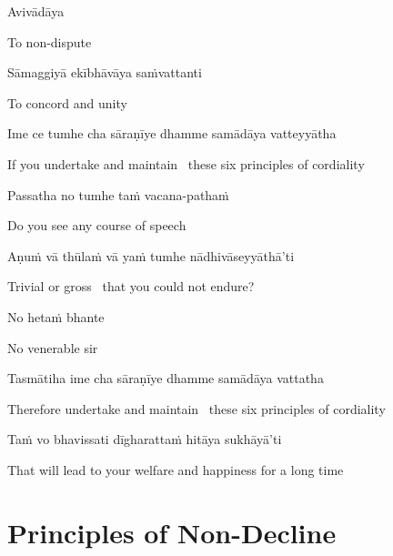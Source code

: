 Avivādāya

\begin{english}
  To non-dispute
\end{english}

Sāmaggiyā ekībhāvāya saṁvattanti

\begin{english}
  To concord and unity
\end{english}

\suttaRef{[MN 48]}

Ime ce tumhe cha sāraṇīye dhamme samādāya vatteyyātha

\begin{english}
  If you undertake and maintain \breathmark\ these six principles of cordiality
\end{english}

Passatha no tumhe taṁ vacana-pathaṁ

\begin{english}
  Do you see any course of speech
\end{english}

Aṇuṁ vā thūlaṁ vā yaṁ tumhe nādhivāseyyāthā’ti

\begin{english}
  Trivial or gross \breathmark\ that you could not endure?
\end{english}

No hetaṁ bhante

\begin{english}
  No venerable sir
\end{english}

Tasmātiha ime cha sāraṇīye dhamme samādāya vattatha

\begin{english}
  Therefore undertake and maintain \breathmark\ these six principles of cordiality
\end{english}

Taṁ vo bhavissati dīgharattaṁ hitāya sukhāyā’ti

\begin{english}
  That will lead to your welfare and happiness for a long time
\end{english}

\suttaRef{[MN 104]}


\section{Principles of Non-Decline}
\label{principles-of-non-decline}

